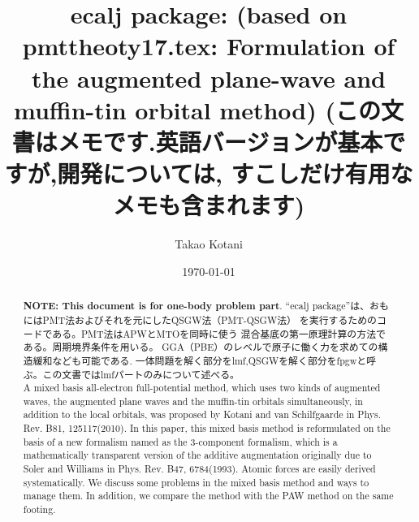 \documentclass[twocolumn,showpacs,preprintnumbers,amsmath,amssymb,floatfix]{revtex4-1}
\begin{document}
\title{ecalj package: (based on pmttheoty17.tex:
Formulation of the augmented plane-wave and muffin-tin orbital method)
(この文書はメモです.英語バージョンが基本ですが,開発については,
すこしだけ有用なメモも含まれます)}
\author{Takao Kotani}
\date{\today}

\begin{abstract}
{\bf NOTE: This document is for one-body problem part}.
``ecalj package''は、おもにはPMT法およびそれを元にしたQSGW法（PMT-QSGW法） 
を実行するためのコードである。PMT法はAPWとMTOを同時に使う
混合基底の第一原理計算の方法である。周期境界条件を用いる。
GGA（PBE）のレベルで原子に働く力を求めての構造緩和なども可能である.
一体問題を解く部分をlmf,QSGWを解く部分をfpgwと呼ぶ。この文書ではlmfパートのみについて述べる。\\

A mixed basis all-electron full-potential method, 
which uses two kinds of augmented waves, the augmented plane waves  
and the muffin-tin orbitals simultaneously, in addition to the
local orbitals, was proposed by Kotani and van Schilfgaarde in Phys. Rev. B81, 125117(2010). 
In this paper, this mixed basis method is reformulated on the basis of a new
formalism named as the 3-component formalism, which is a
mathematically transparent version of the additive
augmentation originally due to Soler and Williams in Phys. Rev. B47, 6784(1993). 
Atomic forces are easily derived systematically. 
We discuss some problems in the mixed basis method and ways to
manage them. In addition, we 
compare the method with the PAW method on the same footing. 
\end{abstract}
\maketitle

\end{document}

